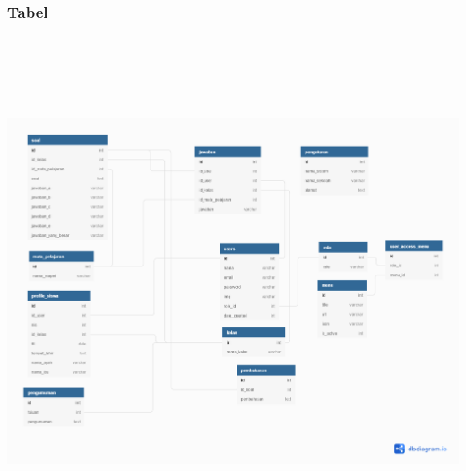 \documentclass{scrreprt}
\begin{document}
		\subsubsection{Tabel}
			\centering
				\includegraphics[width=17cm, height=15cm]{database-wbt.png}
		
		\newpage
		
\end{document}
